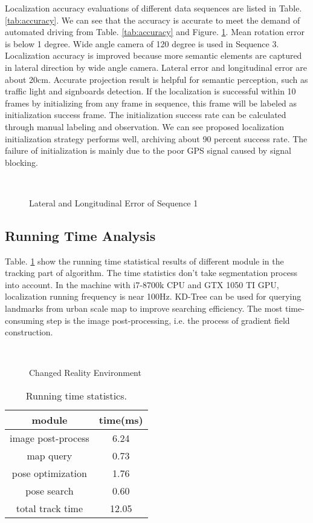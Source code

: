 \documentclass[letterpaper, 10 pt, conference]{ieeeconf}
\begin{document}
Localization accuracy evaluations of different data sequences are listed in Table. \ref{tab:accuracy}. We can see that the accuracy is accurate to meet the demand of automated driving from Table. \ref{tab:accuracy} and Figure. \ref{figure:latlon error}. Mean rotation error is below 1 degree. Wide angle camera of 120 degree is used in Sequence 3. Localization accuracy is improved because more semantic elements are captured in lateral direction by wide angle camera. Lateral error and longitudinal error are about 20cm. Accurate projection result is helpful for semantic perception, such as traffic light and signboards detection. If the localization is successful within 10 frames by initializing from any frame in sequence, this frame will be labeled as initialization success frame. The initialization success rate can be calculated through manual labeling and observation. We can see proposed localization initialization strategy performs well, archiving about 90 percent success rate. The failure of initialization is mainly due to the poor GPS signal caused by signal blocking.


\begin{figure}[]
  \\
  \caption{Lateral and Longitudinal Error of Sequence 1} \label{figure:latlon error}
\end{figure}


\subsection{Running Time Analysis}

Table. \ref{tab:running time} show the running time statistical results of different module in the tracking part of algorithm. The time statistics don't take segmentation process into account. In the machine with i7-8700k CPU and GTX 1050 TI GPU, localization running frequency is near 100Hz. KD-Tree can be used for querying landmarks from urban scale map to improve searching efficiency. The most time-consuming step is the image post-processing, i.e. the process of gradient field construction. 

\begin{figure}[htb]
  \\
  \caption{Changed Reality Environment} \label{figure:map change}
\end{figure}

\begin{table}\small
\caption{Running time statistics.}
\centering
\begin{tabular}{c|c}
\hline
module & time(ms) \\
\hline
    image post-process &6.24 \\
    map query & 0.73 \\
    pose optimization & 1.76 \\
    pose search &0.60 \\
    total track time & 12.05 \\
\hline
    \end{tabular}
\label{tab:running time}
\end{table}
\end{document}

